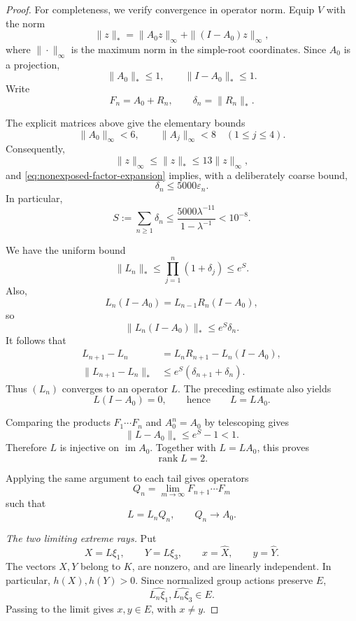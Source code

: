 \documentclass[11pt,reqno]{amsart}
\theoremstyle{plain}
\theoremstyle{definition}
\theoremstyle{remark}
\numberwithin{equation}{section}
\begin{document}
\begin{proof}
For completeness, we verify convergence in operator norm.
Equip $V$ with the norm
\[
\|z\|_*=
\|A_0z\|_\infty+\|(I-A_0)z\|_\infty,
\]
where $\|\cdot\|_\infty$ is the maximum norm in the simple-root
coordinates. Since $A_0$ is a projection,
\[
\|A_0\|_*\le1,
\qquad
\|I-A_0\|_*\le1.
\]
Write
\[
F_n=A_0+R_n,
\qquad
\delta_n=\|R_n\|_*.
\]

The explicit matrices above give the elementary bounds
\[
\|A_0\|_\infty<6,
\qquad
\|A_j\|_\infty<8
\quad(1\le j\le4).
\]
Consequently,
\[
\|z\|_\infty\le\|z\|_*\le13\|z\|_\infty,
\]
and \eqref{eq:nonexposed-factor-expansion} implies, with a
deliberately coarse bound,
\[
\delta_n\le5000\varepsilon_n.
\]
In particular,
\begin{equation}\label{eq:nonexposed-small-perturbation}
S:=\sum_{n\ge1}\delta_n
\le
\frac{5000\lambda^{-11}}{1-\lambda^{-1}}
<10^{-8}.
\end{equation}

We have the uniform bound
\[
\|L_n\|_*
\le
\prod_{j=1}^{n}(1+\delta_j)
\le e^S.
\]
Also,
\[
L_n(I-A_0)=L_{n-1}R_n(I-A_0),
\]
so
\[
\|L_n(I-A_0)\|_*\le e^S\delta_n.
\]
It follows that
\[
\begin{aligned}
L_{n+1}-L_n
&=L_nR_{n+1}-L_n(I-A_0),\\
\|L_{n+1}-L_n\|_*
&\le e^S(\delta_{n+1}+\delta_n).
\end{aligned}
\]
Thus $(L_n)$ converges to an operator $L$.
The preceding estimate also yields
\[
L(I-A_0)=0,
\qquad\text{hence}\qquad
L=LA_0.
\]

Comparing the products $F_1\cdots F_n$ and $A_0^n=A_0$
by telescoping gives
\[
\|L-A_0\|_*\le e^S-1<1.
\]
Therefore $L$ is injective on $\operatorname{im}A_0$.
Together with $L=LA_0$, this proves
\[
\operatorname{rank}L=2.
\]

Applying the same argument to each tail gives operators
\[
Q_n=\lim_{m\to\infty}F_{n+1}\cdots F_m
\]
such that
\begin{equation}\label{eq:nonexposed-tail}
L=L_nQ_n,
\qquad
Q_n\longrightarrow A_0.
\end{equation}

\medskip
\noindent\textit{The two limiting extreme rays.}
Put
\[
X=L\xi_1,
\qquad
Y=L\xi_3,
\qquad
x=\widehat X,
\qquad
y=\widehat Y.
\]
The vectors $X,Y$ belong to $K$, are nonzero, and are linearly
independent. In particular, $h(X),h(Y)>0$.
Since normalized group actions preserve $E$,
\[
\widehat{L_n\xi_1},\widehat{L_n\xi_3}\in E.
\]
Passing to the limit gives $x,y\in E$, with $x\ne y$.


\end{proof}
\end{document}
